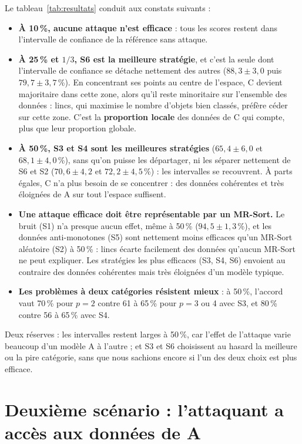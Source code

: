 \documentclass[11pt,a4paper]{article}
\begin{document}
Le tableau~\ref{tab:resultats} conduit aux constats suivants :
\begin{itemize}
  \item \textbf{À 10\,\%, aucune attaque n'est efficace} : tous les scores restent dans l'intervalle de confiance de
        la référence sans attaque.
  \item \textbf{À 25\,\% et $1/3$, S6 est la meilleure stratégie}, et c'est la seule dont l'intervalle de confiance se
        détache nettement des autres ($88{,}3 \pm 3{,}0$ puis $79{,}7 \pm 3{,}7$\,\%). En concentrant ses points au centre
        de l'espace, C devient majoritaire dans cette zone, alors qu'il reste minoritaire sur l'ensemble des
        données : lincs, qui maximise le nombre d'objets bien classés, préfère céder sur cette zone. C'est la
        \textbf{proportion locale} des données de C qui compte, plus que leur proportion globale.
  \item \textbf{À 50\,\%, S3 et S4 sont les meilleures stratégies} ($65{,}4 \pm 6{,}0$ et $68{,}1 \pm 4{,}0$\,\%), sans
        qu'on puisse les départager, ni les séparer nettement de S6 et S2 ($70{,}6 \pm 4{,}2$ et $72{,}2 \pm 4{,}5$\,\%) :
        les intervalles se recouvrent. À parts égales, C n'a plus besoin de se concentrer : des données cohérentes
        et très éloignées de A sur tout l'espace suffisent.
  \item \textbf{Une attaque efficace doit être représentable par un MR-Sort.} Le bruit (S1) n'a presque aucun effet,
        même à 50\,\% ($94{,}5 \pm 1{,}3$\,\%), et les données anti-monotones (S5) sont nettement moins
        efficaces qu'un MR-Sort aléatoire (S2) à 50\,\% : lincs écarte facilement des données qu'aucun MR-Sort ne peut
        expliquer. Les stratégies les plus efficaces (S3, S4, S6) envoient au contraire des données cohérentes
        mais très éloignées d'un modèle typique.
  \item \textbf{Les problèmes à deux catégories résistent mieux} : à 50\,\%, l'accord vaut 70\,\% pour $p=2$ contre 61
        à 65\,\% pour $p=3$ ou 4 avec S3, et 80\,\% contre 56 à 65\,\% avec S4.
\end{itemize}
Deux réserves : les intervalles restent larges à 50\,\%, car l'effet de l'attaque varie beaucoup d'un modèle A à
l'autre ; et S3 et S6 choisissent au hasard la meilleure ou la pire catégorie, sans que nous sachions encore si
l'un des deux choix est plus efficace.

\section{Deuxième scénario : l'attaquant a accès aux données de A}
\end{document}

